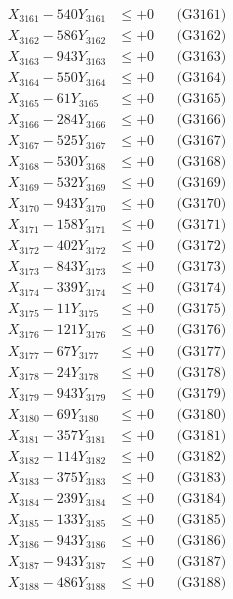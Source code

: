 \documentclass[a4paper,10pt]{article}
\begin{document}
{\begin{align}
\allowbreak
X_{3161} - 540Y_{3161} &\leq +0 && \text{(G3161)} \\
X_{3162} - 586Y_{3162} &\leq +0 && \text{(G3162)} \\
X_{3163} - 943Y_{3163} &\leq +0 && \text{(G3163)} \\
X_{3164} - 550Y_{3164} &\leq +0 && \text{(G3164)} \\
X_{3165} - 61Y_{3165} &\leq +0 && \text{(G3165)} \\
X_{3166} - 284Y_{3166} &\leq +0 && \text{(G3166)} \\
X_{3167} - 525Y_{3167} &\leq +0 && \text{(G3167)} \\
X_{3168} - 530Y_{3168} &\leq +0 && \text{(G3168)} \\
X_{3169} - 532Y_{3169} &\leq +0 && \text{(G3169)} \\
X_{3170} - 943Y_{3170} &\leq +0 && \text{(G3170)} \\
\allowbreak
X_{3171} - 158Y_{3171} &\leq +0 && \text{(G3171)} \\
X_{3172} - 402Y_{3172} &\leq +0 && \text{(G3172)} \\
X_{3173} - 843Y_{3173} &\leq +0 && \text{(G3173)} \\
X_{3174} - 339Y_{3174} &\leq +0 && \text{(G3174)} \\
X_{3175} - 11Y_{3175} &\leq +0 && \text{(G3175)} \\
X_{3176} - 121Y_{3176} &\leq +0 && \text{(G3176)} \\
X_{3177} - 67Y_{3177} &\leq +0 && \text{(G3177)} \\
X_{3178} - 24Y_{3178} &\leq +0 && \text{(G3178)} \\
X_{3179} - 943Y_{3179} &\leq +0 && \text{(G3179)} \\
X_{3180} - 69Y_{3180} &\leq +0 && \text{(G3180)} \\
\allowbreak
X_{3181} - 357Y_{3181} &\leq +0 && \text{(G3181)} \\
X_{3182} - 114Y_{3182} &\leq +0 && \text{(G3182)} \\
X_{3183} - 375Y_{3183} &\leq +0 && \text{(G3183)} \\
X_{3184} - 239Y_{3184} &\leq +0 && \text{(G3184)} \\
X_{3185} - 133Y_{3185} &\leq +0 && \text{(G3185)} \\
X_{3186} - 943Y_{3186} &\leq +0 && \text{(G3186)} \\
X_{3187} - 943Y_{3187} &\leq +0 && \text{(G3187)} \\
X_{3188} - 486Y_{3188} &\leq +0 && \text{(G3188)} \\

\end{align}}
\end{document}
